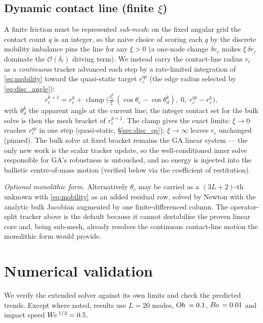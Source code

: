 \documentclass{jfm}
\newcommand{\be}{\begin{equation}}
\newcommand{\ee}{\end{equation}}
\newcommand{\We}{W\kern-0.15em e\,}
\newcommand{\Bo}{B\kern-0.05em o\,}
\newcommand{\Oh}{O\kern-0.05em h\,}
\begin{document}
\subsection{Dynamic contact line (finite $\xi$)}\label{sec:disc_dynamic}
A finite friction must be represented \emph{sub-mesh}: on the fixed angular grid the
contact count $q$ is an integer, so the naive choice of scoring each $q$ by the discrete
mobility imbalance pins the line for any $\xi>0$ (a one-node change $\delta r_c$ makes
$\xi\,\delta r_c$ dominate the $\mathcal O(\delta_t)$ driving term). We instead carry the
contact-line radius $r_c$ as a \emph{continuous} tracker advanced each step by a
rate-limited integration of \eqref{eq:mobility} toward the quasi-static target
$r_c^{\text{qs}}$ (the edge radius selected by \eqref{eq:disc_angle}):
\be\label{eq:disc_mobility}
r_c^{k+1}=r_c^{k}+\operatorname{clamp}\!\Big(\tfrac{\delta_t^{k}}{\xi}\,(\cos\theta_e-\cos\theta_d^{k}),\;
0,\;r_c^{\text{qs}}-r_c^{k}\Big),
\ee
with $\theta_d^{k}$ the apparent angle at the current line; the integer contact set for
the bulk solve is then the mesh bracket of $r_c^{k+1}$. The clamp gives the exact limits:
$\xi\to0$ reaches $r_c^{\text{qs}}$ in one step (quasi-static, \S\ref{sec:disc_qs});
$\xi\to\infty$ leaves $r_c$ unchanged (pinned). The bulk solve at fixed bracket remains
the GA linear system --- the only new work is the scalar tracker update, so the
well-conditioned inner solve responsible for GA's robustness is untouched, and no energy
is injected into the ballistic centre-of-mass motion (verified below via the coefficient
of restitution).

\medskip\noindent\emph{Optional monolithic form.} Alternatively $\theta_c$ may be
carried as a $(3L{+}2)$-th unknown with \eqref{eq:mobility} as an added residual row,
solved by Newton with the analytic bulk Jacobian augmented by one finite-differenced
column. The operator-split tracker above is the default because it cannot destabilise the
proven linear core and, being sub-mesh, already resolves the continuous contact-line
motion the monolithic form would provide.

\section{Numerical validation}\label{sec:validation}

We verify the extended solver against its own limits and check the predicted trends.
Except where noted, results use $L=20$ modes, $\Oh=0.1$, $\Bo=0.01$ and impact speed
$\We^{1/2}=0.5$.
\end{document}
